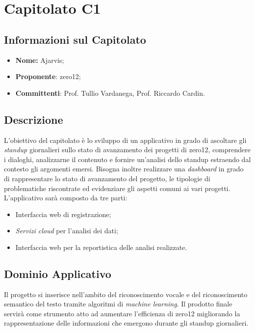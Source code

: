 \section{Capitolato C1}
\subsection{Informazioni sul Capitolato}
\begin{itemize}
	\item \textbf{Nome:} Ajarvis;
	\item \textbf{Proponente}: zero12;
	\item \textbf{Committenti}: Prof. Tullio Vardanega, Prof. Riccardo Cardin.
\end{itemize}

\subsection{Descrizione}
L'obiettivo del capitolato è lo sviluppo di un applicativo in grado di ascoltare gli \textit{standup} giornalieri sullo stato di avanzamento dei progetti di zero12, comprendere i dialoghi, analizzarne il contenuto e fornire un'analisi dello standup estraendo dal contesto gli argomenti emersi. Bisogna inoltre realizzare una \textit{dashboard} in grado di rappresentare lo stato di avanzamento del progetto, le tipologie di problematiche riscontrate ed evidenziare gli aspetti comuni ai vari progetti.
\\
L'applicativo sarà composto da tre parti:
\begin{itemize}
	\item Interfaccia web di registrazione;
	\item \textit{Servizi cloud} per l'analisi dei dati;
	\item Interfaccia web per la reportistica delle analisi realizzate.
\end{itemize}

\subsection{Dominio Applicativo}
Il progetto si inserisce nell'ambito del riconoscimento vocale e del riconoscimento semantico del testo tramite algoritmi di \textit{machine learning}. Il prodotto finale servirà come strumento atto ad aumentare l'efficienza di zero12 migliorando la rappresentazione delle informazioni che emergono durante gli standup giornalieri.

